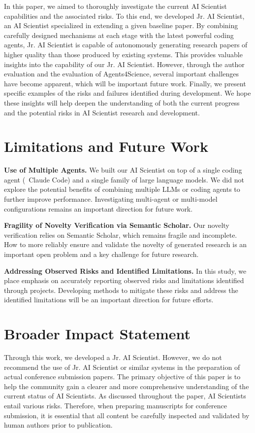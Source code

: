 In this paper, we aimed to thoroughly investigate the current AI Scientist capabilities and the associated risks.
To this end, we developed Jr. AI Scientist, an AI Scientist specialized in extending a given baseline paper.
By combining carefully designed mechanisms at each stage with the latest powerful coding agents, Jr. AI Scientist is capable of autonomously generating research papers of higher quality than those produced by existing systems.
This provides valuable insights into the capability of our Jr. AI Scientist.
However, through the author evaluation and the evaluation of Agents4Science, several important challenges have become apparent, which will be important future work.
Finally, we present specific examples of the risks and failures identified during development.
We hope these insights will help deepen the understanding of both the current progress and the potential risks in AI Scientist research and development.

\section*{Limitations and Future Work}
\textbf{Use of Multiple Agents.}
We built our AI Scientist on top of a single coding agent (\ie~Claude Code) and a single family of large language models. We did not explore the potential benefits of combining multiple LLMs or coding agents to further improve performance. Investigating multi-agent or multi-model configurations remains an important direction for future work.

\textbf{Fragility of Novelty Verification via Semantic Scholar.}
Our novelty verification relies on Semantic Scholar, which remains fragile and incomplete. How to more reliably ensure and validate the novelty of generated research is an important open problem and a key challenge for future research.

\textbf{Addressing Observed Risks and Identified Limitations.}
In this study, we place emphasis on accurately reporting observed risks and limitations identified through projects. Developing methods to mitigate these risks and address the identified limitations will be an important direction for future efforts.


\section*{Broader Impact Statement}
Through this work, we developed a Jr. AI Scientist. However, we do not recommend the use of Jr. AI Scientist or similar systems in the preparation of actual conference submission papers. The primary objective of this paper is to help the community gain a clearer and more comprehensive understanding of the current status of AI Scientists. As discussed throughout the paper, AI Scientists entail various risks. Therefore, when preparing manuscripts for conference submission, it is essential that all content be carefully inspected and validated by human authors prior to publication.

